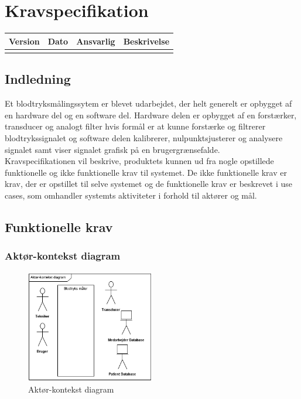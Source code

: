 \chapter{Kravspecifikation}

\begin{longtabu} to 
    Version &    Dato &    Ansvarlig &    Beskrivelse\\[-1ex]
    \midrule
\label{version_Systemark}
\end{longtabu}


\section{Indledning}
 Et blodtryksmålingssytem er blevet udarbejdet, der helt generelt er opbygget af en hardware del og en software del. Hardware delen er opbygget af en forstærker, transducer og analogt filter hvis formål er at kunne forstærke og filtrerer blodtrykssignalet og software delen kalibrerer, nulpunktsjusterer og analysere signalet samt viser signalet grafisk på en brugergrænsefalde. \\
 Kravspecifikationen vil beskrive, produktets kunnen ud fra nogle opstillede funktionelle og ikke funktionelle krav til systemet. De ikke funktionelle krav er krav, der er opstillet til selve systemet og de funktionelle krav er beskrevet i use cases, som omhandler systemts aktiviteter i forhold til aktører og mål. 


\section{Funktionelle krav}
\subsection{Aktør-kontekst diagram}

\begin{figure}[H]
	\centering
	\includegraphics[width=0.5\textwidth]{Figurer/ISE/aktdiagram2}
	\caption{Aktør-kontekst diagram}
	\label{Aktdiagram}
\end{figure}


